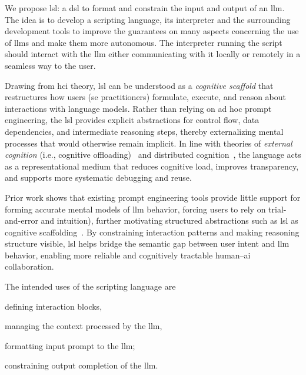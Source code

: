 \documentclass[manuscript,screen]{acmart}
\begin{document}
We propose \ac{lsl}: a \ac{dsl} to format and constrain the input and output of an \ac{llm}.
The idea is to develop a scripting language, its interpreter and the surrounding development tools to improve the guarantees on many aspects concerning the use of \acp{llm} and make them more autonomous.
The interpreter running the script should interact with the \ac{llm} either communicating with it locally or remotely in a seamless way to the user.

Drawing from \ac{hci} theory, \ac{lsl} can be understood as a \emph{cognitive scaffold} that restructures how users (\ac{se} practitioners) formulate, execute, and reason about interactions with language models. 
Rather than relying on ad hoc prompt engineering, the \ac{lsl} provides explicit abstractions for control flow, data dependencies, and intermediate reasoning steps, thereby externalizing mental processes that would otherwise remain implicit. 
In line with theories of \emph{external cognition} (i.e., cognitive offloading)~\cite{10.5555/200550} and distributed cognition~\cite{DBLP:journals/tochi/HollanHK00,Obendorf2009}, the language acts as a representational medium that reduces cognitive load, improves transparency, and supports more systematic debugging and reuse. 

Prior work shows that existing prompt engineering tools provide little support for forming accurate mental models of \ac{llm} behavior, forcing users to rely on trial-and-error and intuition), further motivating structured abstractions such as \ac{lsl} as cognitive scaffolding~\cite{10.1145/3544549.3585737}.
By constraining interaction patterns and making reasoning structure visible, \ac{lsl} helps bridge the semantic gap between user intent and \ac{llm} behavior, enabling more reliable and cognitively tractable human–\ac{ai} collaboration.

The intended uses of the scripting language are
\begin{enumerate*}[label=(\roman*)]
    \item defining interaction blocks,
    \item managing the context processed by the \ac{llm},
    \item formatting input prompt to the \ac{llm};
    \item constraining output completion of the \ac{llm}.
\end{enumerate*}
\end{document}

